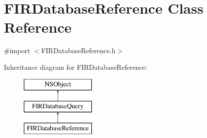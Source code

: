 \hypertarget{interface_f_i_r_database_reference}{}\section{F\+I\+R\+Database\+Reference Class Reference}
\label{interface_f_i_r_database_reference}


{\ttfamily \#import $<$F\+I\+R\+Database\+Reference.\+h$>$}

Inheritance diagram for F\+I\+R\+Database\+Reference\+:\begin{figure}[H]
\begin{center}
\leavevmode
\includegraphics[height=3.000000cm]{interface_f_i_r_database_reference}
\end{center}
\end{figure}
